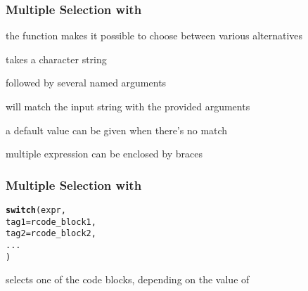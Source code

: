 \documentclass[12pt]{beamer}\usepackage[]{graphicx}\usepackage[]{color}
\makeatletter
\newcommand{\hlstd}[1]{\textcolor[rgb]{0.345,0.345,0.345}{#1}}%
\newcommand{\hlkwc}[1]{\textcolor[rgb]{0.333,0.667,0.333}{#1}}%
\newcommand{\hlkwd}[1]{\textcolor[rgb]{0.737,0.353,0.396}{\textbf{#1}}}%
\newenvironment{kframe}{%
 \def\at@end@of@kframe{}%
 \ifinner\ifhmode%
  \def\at@end@of@kframe{\end{minipage}}%
  \begin{minipage}{\columnwidth}%
 \fi\fi%
 \def\FrameCommand##1{\hskip\@totalleftmargin \hskip-\fboxsep
 \colorbox{shadecolor}{##1}\hskip-\fboxsep
     \hskip-\linewidth \hskip-\@totalleftmargin \hskip\columnwidth}%
 \MakeFramed {\advance\hsize-\width
   \@totalleftmargin\z@ \linewidth\hsize
   \@setminipage}}%
 {\par\unskip\endMakeFramed%
 \at@end@of@kframe}
\newenvironment{knitrout}{}{} %
\makeatother
\begin{document}

\begin{frame}[fragile]
\frametitle{Multiple Selection with }

\bi
  \item the  function makes it possible to choose between various alternatives
  \item {} takes a character string
  \item followed by several named arguments
  \item {} will match the input string with the provided arguments
  \item a default value can be given when there's no match
  \item multiple expression can be enclosed by braces
\ei

\end{frame}


\begin{frame}[fragile]
\frametitle{Multiple Selection with }

\begin{knitrout}\footnotesize
{}\color{fgcolor}\begin{kframe}
\begin{alltt}
\hlkwd{switch}\hlstd{(expr,}
       \hlkwc{tag1} \hlstd{= rcode_block1,}
       \hlkwc{tag2} \hlstd{= rcode_block2,}
       \hlstd{...}
       \hlstd{)}
\end{alltt}
\end{kframe}
\end{knitrout}
 selects one of the code blocks, depending on the value of 

\end{frame}

\end{document}
